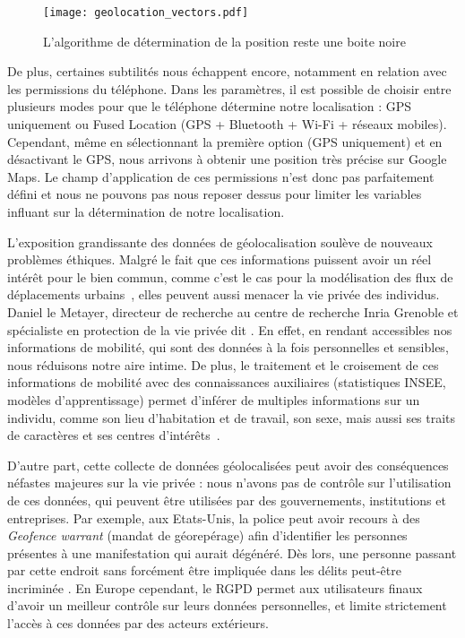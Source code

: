 \documentclass[runningheads]{llncs}
\begin{document}
\begin{figure}
\centering
\texttt{[image: geolocation\_vectors.pdf]}
\caption{L'algorithme de détermination de la position reste une boite noire}
\setlength{\belowcaptionskip}{-10pt}
    \label{fig:blackbox}
\end{figure}

De plus, certaines subtilités nous échappent encore, notamment en relation avec les permissions du téléphone. Dans les paramètres, il est possible de choisir entre plusieurs modes pour que le téléphone détermine notre localisation : GPS uniquement ou Fused Location (GPS + Bluetooth + Wi-Fi + réseaux mobiles). Cependant, même en sélectionnant la première option (GPS uniquement) et en désactivant le GPS, nous arrivons à obtenir une position très précise sur Google Maps. Le champ d'application de ces permissions n'est donc pas parfaitement défini et nous ne pouvons pas nous reposer dessus pour limiter les variables influant sur la détermination de notre localisation.

L'exposition grandissante des données de géolocalisation soulève de nouveaux problèmes éthiques. Malgré le fait que ces informations puissent avoir un réel intérêt pour le bien commun, comme c'est le cas pour la modélisation des flux de déplacements urbains~\cite{calacci_tradeoff_2019}, elles peuvent aussi menacer la vie privée des individus. Daniel le Metayer, directeur de recherche au centre de recherche Inria Grenoble et spécialiste en protection de la vie privée dit . En effet, en rendant accessibles nos informations de mobilité, qui sont des données à la fois personnelles et sensibles, nous réduisons notre aire intime. De plus, le traitement et le croisement de ces informations de mobilité avec des connaissances auxiliaires (statistiques INSEE, modèles d'apprentissage) permet d'inférer de multiples informations sur un individu, comme son lieu d'habitation et de travail, son sexe, mais aussi ses traits de caractères et ses centres d'intérêts~\cite{boutet_inspect_2019}.

D'autre part, cette collecte de données géolocalisées peut avoir des conséquences néfastes majeures sur la vie privée : nous n'avons pas de contrôle sur l'utilisation de ces données, qui peuvent être utilisées par des gouvernements, institutions et entreprises. Par exemple, aux Etats-Unis, la police peut avoir recours à des \textit{Geofence warrant} (mandat de géorepérage) afin d'identifier les personnes présentes à une manifestation qui aurait dégénéré. Dès lors, une personne passant par cette endroit sans forcément être impliquée dans les délits peut-être incriminée \cite{chatrie_united_2019}. En Europe cependant, le RGPD permet aux utilisateurs finaux d'avoir un meilleur contrôle sur leurs données personnelles, et limite strictement l'accès à ces données par des acteurs extérieurs.
\end{document}
